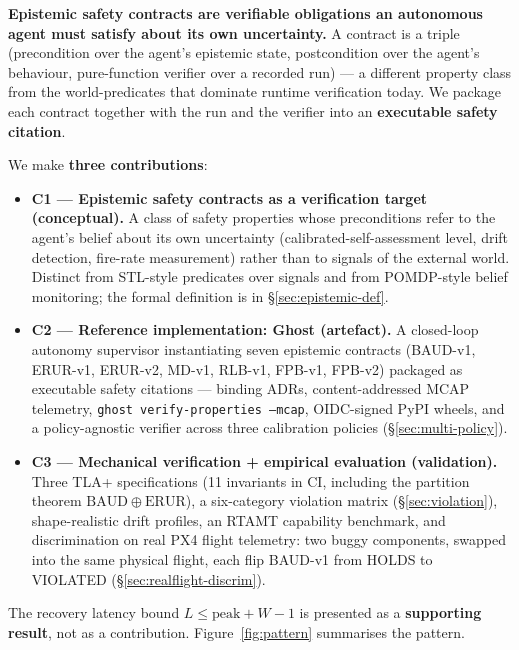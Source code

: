 \documentclass[11pt,a4paper]{article}
\begin{document}
\textbf{Epistemic safety contracts are verifiable obligations an
autonomous agent must satisfy about its own uncertainty.} A
contract is a triple (precondition over the agent's epistemic
state, postcondition over the agent's behaviour, pure-function
verifier over a recorded run) --- a different property class from
the world-predicates that dominate runtime verification today. We
package each contract together with the run and the verifier into
an \textbf{executable safety citation}.

We make \textbf{three contributions}:

\begin{itemize}
  \item \textbf{C1 --- Epistemic safety contracts as a
        verification target (conceptual).} A class of safety
        properties whose preconditions refer to the agent's
        belief about its own uncertainty
        (calibrated-self-assessment level, drift detection,
        fire-rate measurement) rather than to signals of the
        external world. Distinct from STL-style predicates over
        signals and from POMDP-style belief monitoring; the
        formal definition is in \S\ref{sec:epistemic-def}.
  \item \textbf{C2 --- Reference implementation: Ghost
        (artefact).} A closed-loop autonomy supervisor
        instantiating seven epistemic contracts (BAUD-v1, ERUR-v1,
        ERUR-v2, MD-v1, RLB-v1, FPB-v1, FPB-v2) packaged as
        executable safety citations --- binding ADRs, content-addressed MCAP
        telemetry, \texttt{ghost verify-properties --mcap},
        OIDC-signed PyPI wheels, and a policy-agnostic verifier
        across three calibration policies
        (\S\ref{sec:multi-policy}).
  \item \textbf{C3 --- Mechanical verification + empirical
        evaluation (validation).} Three TLA+ specifications
        (11 invariants in CI, including the partition theorem
        $\mathrm{BAUD} \oplus \mathrm{ERUR}$), a six-category
        violation matrix (\S\ref{sec:violation}), shape-realistic
        drift profiles, an RTAMT capability benchmark, and
        discrimination on real PX4 flight telemetry: two buggy
        components, swapped into the same physical flight, each
        flip BAUD-v1 from HOLDS to VIOLATED
        (\S\ref{sec:realflight-discrim}).
\end{itemize}

The recovery latency bound $L \le \mathrm{peak} + W - 1$ is
presented as a \textbf{supporting result}, not as a contribution.
Figure~\ref{fig:pattern} summarises the pattern.
\end{document}
